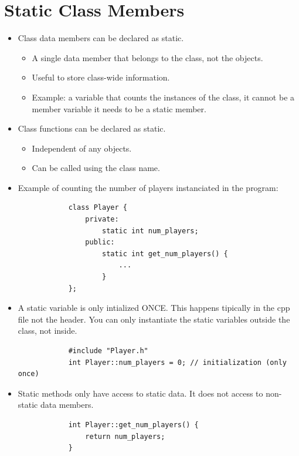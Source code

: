 \section{Static Class Members}
\begin{itemize}
    \item Class data members can be declared as static.
        \begin{itemize}
            \item A single data member that belongs to the class, not the objects.
            \item Useful to store class-wide information.
            \item Example: a variable that counts the instances of the class, it cannot be a member variable it needs to be a static member.
        \end{itemize}
    \item Class functions can be declared as static.
        \begin{itemize}
            \item Independent of any objects.
            \item Can be called using the class name.
        \end{itemize}
    
    \item Example of counting the number of players instanciated in the program:
        \begin{verbatim}
            class Player {
                private: 
                    static int num_players;
                public:
                    static int get_num_players() {
                        ...
                    }
            };
        \end{verbatim}
    
    \item A static variable is only intialized ONCE. This happens tipically in the cpp file not the header. You can only instantiate the static variables outside the class, not inside.
        \begin{verbatim}
            #include "Player.h"
            int Player::num_players = 0; // initialization (only once)
        \end{verbatim}
    
    \item Static methods only have access to static data. It does not access to non-static data members.
        \begin{verbatim}
            int Player::get_num_players() {
                return num_players;
            }
        \end{verbatim}
    

\end{itemize}
